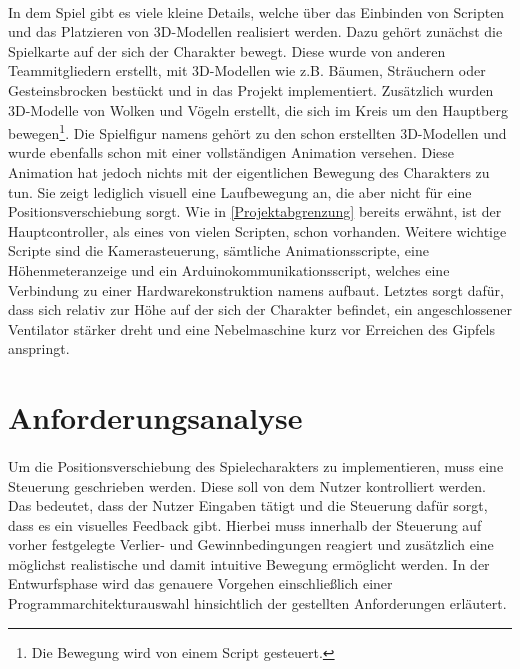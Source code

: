 \paragraph{}
In dem Spiel gibt es viele kleine Details, welche über das Einbinden von Scripten und das Platzieren von 3D-Modellen realisiert werden. Dazu gehört zunächst die Spielkarte auf der sich der Charakter bewegt. Diese wurde von anderen Teammitgliedern erstellt, mit 3D-Modellen wie z.B. Bäumen, Sträuchern oder Gesteinsbrocken bestückt und in das Projekt implementiert. Zusätzlich wurden 3D-Modelle von Wolken und Vögeln erstellt, die sich im Kreis um den Hauptberg bewegen\footnote{Die Bewegung wird von einem Script gesteuert.}.
Die Spielfigur namens  gehört zu den schon erstellten 3D-Modellen und wurde ebenfalls schon mit einer vollständigen Animation versehen. Diese Animation hat jedoch nichts mit der eigentlichen Bewegung des Charakters zu tun. Sie zeigt lediglich visuell eine Laufbewegung an, die aber nicht für eine Positionsverschiebung sorgt. 
Wie in \autoref{Projektabgrenzung}  bereits erwähnt, ist der Hauptcontroller, als eines von vielen Scripten, schon vorhanden. Weitere wichtige Scripte sind die Kamerasteuerung, sämtliche Animationsscripte, eine Höhenmeteranzeige und ein Arduinokommunikationsscript, welches eine Verbindung zu einer Hardwarekonstruktion namens  aufbaut. Letztes sorgt dafür, dass sich relativ zur Höhe auf der sich der Charakter befindet, ein angeschlossener Ventilator stärker dreht und eine Nebelmaschine kurz vor Erreichen des Gipfels anspringt.

\section{Anforderungsanalyse}
\paragraph{}
Um die Positionsverschiebung des Spielecharakters zu implementieren, muss eine Steuerung geschrieben werden. Diese soll von dem Nutzer kontrolliert werden. Das bedeutet, dass der Nutzer Eingaben tätigt und die Steuerung dafür sorgt, dass es ein visuelles Feedback gibt. Hierbei muss innerhalb der Steuerung auf vorher festgelegte Verlier- und Gewinnbedingungen reagiert und zusätzlich eine möglichst realistische und damit intuitive Bewegung ermöglicht werden. In der Entwurfsphase wird das genauere Vorgehen einschließlich einer Programmarchitekturauswahl hinsichtlich der gestellten Anforderungen erläutert.

